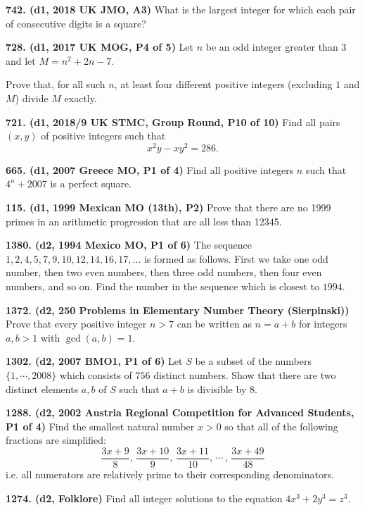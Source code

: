 \documentclass{article}
\begin{document}
\textbf{742. (\color{red}d1\color{black}, 2018 UK JMO, A3)} What is the largest integer for which each pair of consecutive digits is a square?

\textbf{728. (\color{red}d1\color{black}, 2017 UK MOG, P4 of 5)} Let $n$ be an odd integer greater than $3$ and let $M=n^2+2n-7$.

Prove that, for all such $n$, at least four different positive integers (excluding $1$ and $M$) divide $M$ exactly.

\textbf{721. (\color{red}d1\color{black}, 2018/9 UK STMC, Group Round, P10 of 10)} Find all pairs $(x,y)$ of positive integers such that $$x^2y-xy^2=286.$$

\textbf{665. (\color{red}d1\color{black}, 2007 Greece MO, P1 of 4)} Find all positive integers $n$ such that $4^n + 2007$ is a perfect square.

\textbf{115. (\color{red}d1\color{black}, 1999 Mexican MO (13th), P2)} Prove that there are no 1999 primes in an arithmetic progression that are all less than 12345.

\textbf{1380. (\color{red}d2\color{black}, 1994 Mexico MO, P1 of 6)} The sequence $1, 2, 4, 5, 7, 9 ,10, 12, 14, 16, 17, ... $ is formed as follows. First we take one odd number, then two even numbers, then three odd numbers, then four even numbers, and so on. Find the number in the sequence which is closest to $1994$.

\textbf{1372. (\color{red}d2\color{black}, 250 Problems in Elementary Number Theory (Sierpinski))} Prove that every positive integer $n > 7$ can be written as $n = a + b$ for integers $a, b > 1$ with $\gcd(a, b) = 1$.

\textbf{1302. (\color{red}d2\color{black}, 2007 BMO1, P1 of 6)} Let $S$ be a subset of the numbers $\{1, \cdots, 2008\}$ which consists of $756$ distinct numbers. Show that there are two distinct elements $a, b$ of $S$ such that $a+b$ is divisible by $8$.

\textbf{1288. (\color{red}d2\color{black}, 2002 Austria Regional Competition for Advanced Students, P1 of 4)} Find the smallest natural number $x > 0$ so that all of the following fractions are simplified:\begin{equation*}\frac{3x+9}{8},\, \frac{3x+10}{9},\, \frac{3x+11}{10},\, \cdots\!\!\,,\, \frac{3x+49}{48}\end{equation*}i.e. all numerators are relatively prime to their corresponding denominators.

\textbf{1274. (\color{red}d2\color{black}, Folklore)} Find all integer solutions to the equation $4x^3 + 2y^3 = z^3$.
\end{document}
